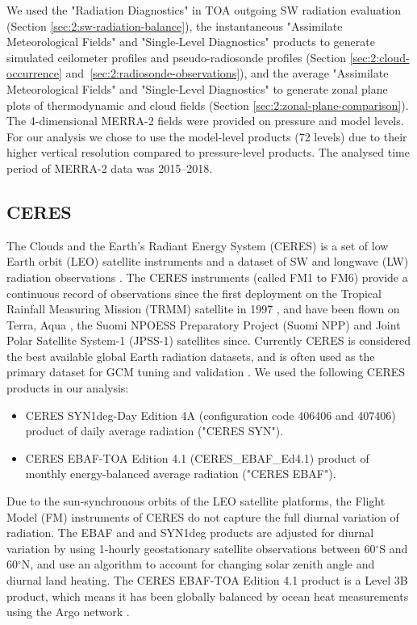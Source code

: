 We used the "Radiation Diagnostics" in TOA outgoing SW radiation evaluation (Section
\ref{sec:2:sw-radiation-balance}), the instantaneous "Assimilate Meteorological
Fields" and "Single-Level Diagnostics" products to generate simulated
ceilometer profiles and pseudo-radiosonde profiles (Section
\ref{sec:2:cloud-occurrence} and~\ref{sec:2:radiosonde-observations}), and the
average "Assimilate Meteorological Fields" and "Single-Level Diagnostics" to
generate zonal plane plots of thermodynamic and cloud fields (Section
\ref{sec:2:zonal-plane-comparison}). The 4-dimensional MERRA-2 fields were
provided on pressure and model levels. For our analysis we chose to use the
model-level products (72 levels) due to their higher vertical resolution
compared to pressure-level products. The analysed time period of MERRA-2 data
was 2015--2018.

\subsection{CERES}

The Clouds and the Earth's Radiant Energy System (CERES) is a set of low Earth
orbit (LEO) satellite instruments and a dataset of SW and longwave (LW)
radiation observations \citep{loeb2018,doelling2016}. The CERES instruments
(called FM1 to FM6) provide a continuous record of observations since the first
deployment on the Tropical Rainfall Measuring Mission (TRMM) satellite in 1997
\citep{simpson1996}, and have been flown on Terra, Aqua \citep{parkinson2003},
the Suomi NPOESS Preparatory Project (Suomi NPP) and Joint Polar Satellite
System-1 (JPSS-1) \citep{goldberg2013} satellites since. Currently CERES is
considered the best available global Earth radiation datasets, and is often used
as the primary dataset for GCM tuning and validation
\citep{schmidt2017,hourdin2017}. We used the following CERES products in our
analysis:

\begin{itemize}
\item CERES SYN1deg-Day Edition 4A (configuration code 406406 and 407406)
product of daily average radiation ("CERES SYN").
\item CERES EBAF-TOA Edition 4.1 (CERES\_EBAF\_Ed4.1)
product of monthly energy-balanced average radiation ("CERES EBAF").
\end{itemize}

Due to the sun-synchronous orbits of the LEO satellite platforms, the Flight
Model (FM) instruments of CERES do not capture the full diurnal variation of
radiation. The EBAF and and SYN1deg products are adjusted for diurnal variation
by using 1-hourly geostationary satellite observations between 60$^\circ$S and
60$^\circ$N, and use an algorithm to account for changing solar zenith angle and
diurnal land heating. The CERES EBAF-TOA Edition 4.1 product is a Level 3B
product, which means it has been globally balanced by ocean heat measurements
using the Argo network \citep{roemmich2009a,roemmich2009b}.

